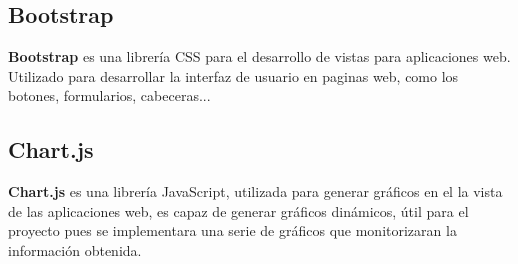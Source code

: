 \subsection{Bootstrap}

\textbf{Bootstrap} es una librería  CSS para el desarrollo de vistas para aplicaciones web. Utilizado para desarrollar la interfaz de usuario en paginas web, como los botones, formularios, cabeceras...

\subsection{Chart.js}

\textbf{Chart.js} es una librería JavaScript, utilizada para generar gráficos en el la vista de las aplicaciones web, es capaz de generar gráficos dinámicos, útil para el proyecto pues se implementara una serie de gráficos que monitorizaran la información obtenida.



